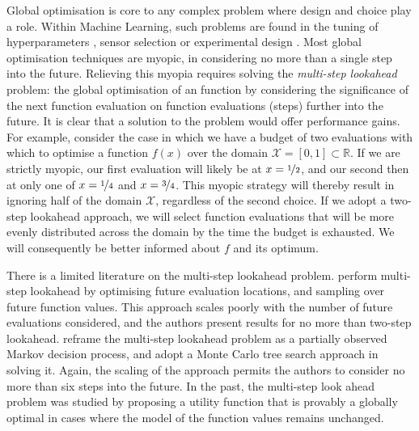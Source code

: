 \documentclass[twoside]{article}
\newcommand{\reals}{\mathbb{R}}
\newcommand{\sX}{\mathcal{X}}
\begin{document}
Global optimisation is core to any complex problem where design and choice play a role. 
Within Machine Learning, such problems are found in the tuning of hyperparameters \citep{Snoek*Larochelle*Adams_2012}, sensor selection \citep{Garnett*Osborne*Roberts_2010} or experimental design \citep{martinez-cantin_bayesian_2009}. 
Most global optimisation techniques are myopic, in considering no more than a single step into the future. 
Relieving this myopia requires solving the \emph{multi-step lookahead} problem: the global optimisation of an function by considering the significance of the next function evaluation on function evaluations (steps) further into the future. 
It is clear that a solution to the problem would offer performance gains.
For example, consider the case in which we have a budget of two evaluations with which to optimise a function $f(x)$ over the domain $\sX = [0, 1] \subset \reals$. 
If we are strictly myopic, our first evaluation will likely be at 
$x=\nicefrac{1}{2}$, and our second then at only one of $x=\nicefrac{1}{4}$ and $x=\nicefrac{3}{4}$. 
This myopic strategy will thereby result in ignoring half of the domain $\sX$, regardless of the second choice. 
If we adopt a two-step lookahead approach, we will select function evaluations that will be more evenly distributed across the domain by the time the budget is exhausted. 
We will consequently be better informed about $f$ and its optimum.

There is a limited literature on the multi-step lookahead problem.
\cite{osborne_gaussian_2009} perform multi-step lookahead by optimising future evaluation locations, and sampling over future function values. 
This approach scales poorly with the number of future evaluations considered, and the authors present results for no more than two-step lookahead.
\citep{Marchant*Ramos*Sanner*2014} reframe the multi-step lookahead problem as a partially observed Markov decision process, and adopt a Monte Carlo tree search approach in solving it. 
Again, the scaling of the approach permits the authors to consider no more than six steps into the future. In the past, the multi-step look ahead problem was studied by \cite{StreltsovVakili1999} proposing a utility function that is provably a globally optimal in cases where the model of the function values remains unchanged.
\end{document}
